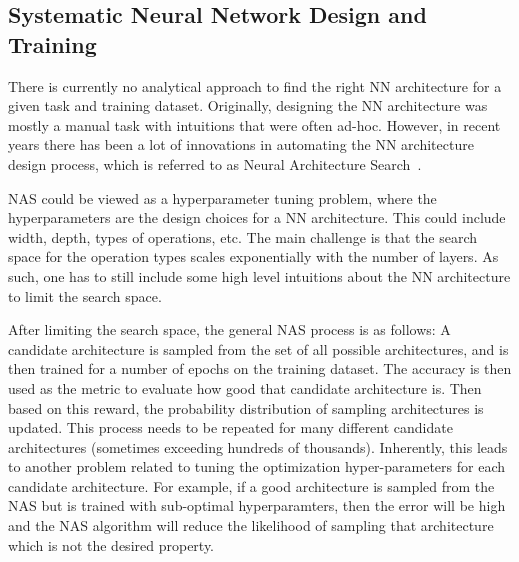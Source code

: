 \subsection{Systematic Neural Network Design and Training}
\label{sec:train}

There is currently no analytical approach to find the right NN architecture for
a given task and training dataset.
Originally, designing the NN architecture was mostly a manual task with
intuitions that were often ad-hoc. However, in recent years there has been
a lot of innovations in automating the NN architecture design process, which is 
referred to as Neural Architecture Search~\cite{zoph2016neural,pham2018efficient,tan2019mnasnet,liu2018darts,wu2019fbnet,cai2018proxylessnas,cai2019once}.

NAS could be viewed as a hyperparameter tuning problem, where the hyperparameters are
the design choices for a NN architecture. This could include
width, depth, types of operations, etc. The main challenge
is that the search space for the operation types scales exponentially with the number
of layers.
As such, one has to still include some high level intuitions about the NN architecture
to limit the search space. 

After limiting the search space, the general NAS process is as follows:
A candidate architecture is sampled from the set of all
possible architectures, and is then trained for a number of epochs on the training dataset.
The accuracy is then used 
as the metric to evaluate how good that candidate architecture is. Then based
on this reward, the probability distribution of sampling architectures is updated.
This process needs to be repeated for many different candidate architectures (sometimes exceeding
hundreds of thousands). 
Inherently, this leads to another problem related to tuning the optimization hyper-parameters
for each candidate architecture.
For example, if a good architecture is sampled from the NAS but
is trained with sub-optimal hyperparamters, then the error will be high and the NAS algorithm will reduce the likelihood
of sampling that architecture which is not the desired property.



